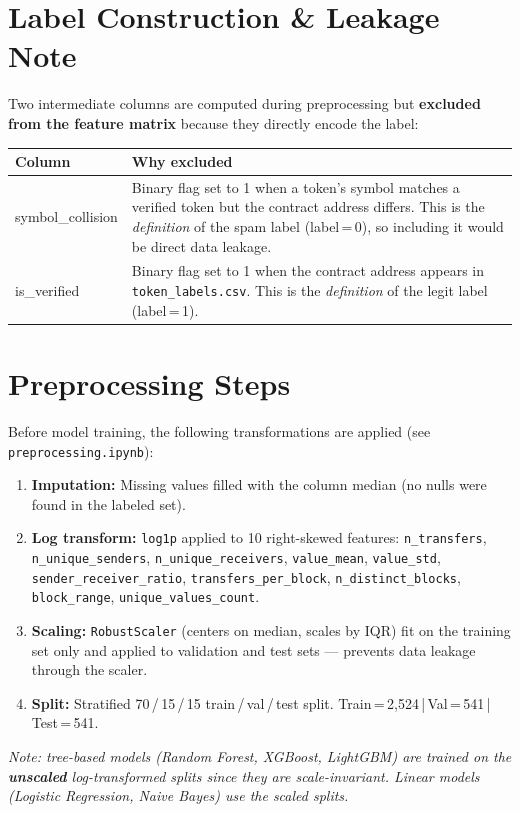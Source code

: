 \documentclass[11pt, a4paper]{article}
\begin{document}
\section{Label Construction \& Leakage Note}

Two intermediate columns are computed during preprocessing but \textbf{excluded from the feature matrix}
because they directly encode the label:

\vspace{0.5em}
\begin{tabular}{>{\ttfamily}p{3.8cm} p{10.4cm}}
\toprule
\normalfont\textbf{Column} & \textbf{Why excluded} \\
\midrule
symbol\_collision & Binary flag set to 1 when a token's symbol matches a verified token but the contract address differs. This is the \emph{definition} of the spam label (label\,=\,0), so including it would be direct data leakage. \\[4pt]
is\_verified & Binary flag set to 1 when the contract address appears in \texttt{token\_labels.csv}. This is the \emph{definition} of the legit label (label\,=\,1). \\
\bottomrule
\end{tabular}

\section{Preprocessing Steps}

Before model training, the following transformations are applied (see \texttt{preprocessing.ipynb}):

\begin{enumerate}
  \item \textbf{Imputation:} Missing values filled with the column median (no nulls were found in the labeled set).
  \item \textbf{Log transform:} \texttt{log1p} applied to 10 right-skewed features:
        \texttt{n\_transfers}, \texttt{n\_unique\_senders}, \texttt{n\_unique\_receivers},
        \texttt{value\_mean}, \texttt{value\_std}, \texttt{sender\_receiver\_ratio},
        \texttt{transfers\_per\_block}, \texttt{n\_distinct\_blocks}, \texttt{block\_range},
        \texttt{unique\_values\_count}.
  \item \textbf{Scaling:} \texttt{RobustScaler} (centers on median, scales by IQR) fit on the training set only and applied to validation and test sets --- prevents data leakage through the scaler.
  \item \textbf{Split:} Stratified 70\,/\,15\,/\,15 train\,/\,val\,/\,test split.
        Train\,=\,2,524\,|\,Val\,=\,541\,|\,Test\,=\,541.
\end{enumerate}

\textit{Note: tree-based models (Random Forest, XGBoost, LightGBM) are trained on the \textbf{unscaled} log-transformed splits since they are scale-invariant. Linear models (Logistic Regression, Naive Bayes) use the scaled splits.}
\end{document}
